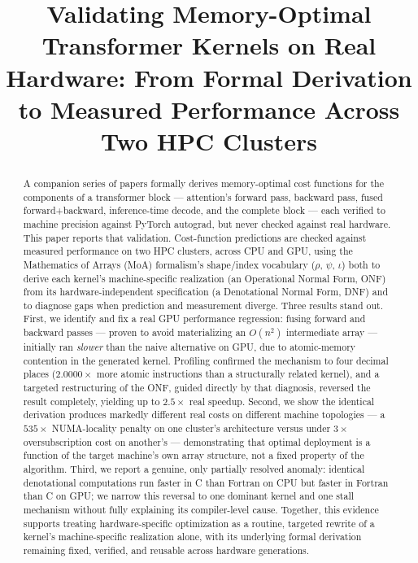 \documentclass[sigconf,review,anonymous]{acmart}
\begin{document}
\title[Validating Memory-Optimal Transformer Kernels on Real Hardware]{Validating Memory-Optimal Transformer Kernels on Real Hardware:
From Formal Derivation to Measured Performance Across Two HPC Clusters}

\begin{abstract}
A companion series of papers formally derives memory-optimal cost
functions for the components of a transformer block --- attention's
forward pass, backward pass, fused forward+backward, inference-time
decode, and the complete block --- each verified to machine precision
against PyTorch autograd, but never checked against real hardware. This
paper reports that validation. Cost-function predictions are checked
against measured performance on two HPC clusters, across CPU and GPU,
using the Mathematics of Arrays (MoA) formalism's shape/index
vocabulary ($\rho$, $\psi$, $\iota$) both to derive each kernel's
machine-specific realization (an Operational Normal Form, ONF) from its
hardware-independent specification (a Denotational Normal Form, DNF)
and to diagnose gaps when prediction and measurement diverge. Three
results stand out. First, we identify and fix a real GPU performance
regression: fusing forward and backward passes --- proven to avoid
materializing an $O(n^2)$ intermediate array --- initially ran
\emph{slower} than the naive alternative on GPU, due to atomic-memory
contention in the generated kernel. Profiling confirmed the mechanism
to four decimal places ($2.0000\times$ more atomic instructions than a
structurally related kernel), and a targeted restructuring of the ONF,
guided directly by that diagnosis, reversed the result completely,
yielding up to $2.5\times$ real speedup. Second, we show the identical
derivation produces markedly different real costs on different machine
topologies --- a $535\times$ NUMA-locality penalty on one cluster's
architecture versus under $3\times$ oversubscription cost on another's
--- demonstrating that optimal deployment is a function of the target
machine's own array structure, not a fixed property of the algorithm.
Third, we report a genuine, only partially resolved anomaly: identical
denotational computations run faster in C than Fortran on CPU but
faster in Fortran than C on GPU; we narrow this reversal to one
dominant kernel and one stall mechanism without fully explaining its
compiler-level cause. Together, this evidence supports treating
hardware-specific optimization as a routine, targeted rewrite of a
kernel's machine-specific realization alone, with its underlying formal
derivation remaining fixed, verified, and reusable across hardware
generations.
\end{abstract}
\end{document}
